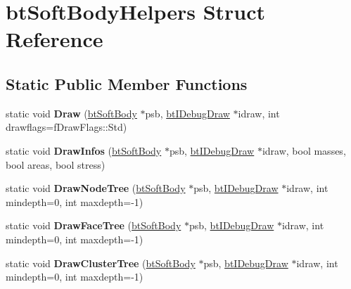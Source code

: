 \hypertarget{structbt_soft_body_helpers}{\section{bt\+Soft\+Body\+Helpers Struct Reference}
\label{structbt_soft_body_helpers}
}
\subsection*{Static Public Member Functions}
\begin{DoxyCompactItemize}
\item 
\hypertarget{structbt_soft_body_helpers_aa13548829cdaa2f8d3cdd682ab658bf7}{static void {\bfseries Draw} (\hyperlink{classbt_soft_body}{bt\+Soft\+Body} $\ast$psb, \hyperlink{classbt_i_debug_draw}{bt\+I\+Debug\+Draw} $\ast$idraw, int drawflags=f\+Draw\+Flags\+::\+Std)}\label{structbt_soft_body_helpers_aa13548829cdaa2f8d3cdd682ab658bf7}

\item 
\hypertarget{structbt_soft_body_helpers_a6f12ed786886ba13224bd36b9f2e2346}{static void {\bfseries Draw\+Infos} (\hyperlink{classbt_soft_body}{bt\+Soft\+Body} $\ast$psb, \hyperlink{classbt_i_debug_draw}{bt\+I\+Debug\+Draw} $\ast$idraw, bool masses, bool areas, bool stress)}\label{structbt_soft_body_helpers_a6f12ed786886ba13224bd36b9f2e2346}

\item 
\hypertarget{structbt_soft_body_helpers_a2e6b38d4cffb1a98d81a3af55704686e}{static void {\bfseries Draw\+Node\+Tree} (\hyperlink{classbt_soft_body}{bt\+Soft\+Body} $\ast$psb, \hyperlink{classbt_i_debug_draw}{bt\+I\+Debug\+Draw} $\ast$idraw, int mindepth=0, int maxdepth=-\/1)}\label{structbt_soft_body_helpers_a2e6b38d4cffb1a98d81a3af55704686e}

\item 
\hypertarget{structbt_soft_body_helpers_a56a1fa5900877d6b0c06de4787a995fe}{static void {\bfseries Draw\+Face\+Tree} (\hyperlink{classbt_soft_body}{bt\+Soft\+Body} $\ast$psb, \hyperlink{classbt_i_debug_draw}{bt\+I\+Debug\+Draw} $\ast$idraw, int mindepth=0, int maxdepth=-\/1)}\label{structbt_soft_body_helpers_a56a1fa5900877d6b0c06de4787a995fe}

\item 
\hypertarget{structbt_soft_body_helpers_a7d0e5fd9ecf565e6605af383092a733f}{static void {\bfseries Draw\+Cluster\+Tree} (\hyperlink{classbt_soft_body}{bt\+Soft\+Body} $\ast$psb, \hyperlink{classbt_i_debug_draw}{bt\+I\+Debug\+Draw} $\ast$idraw, int mindepth=0, int maxdepth=-\/1)}\label{structbt_soft_body_helpers_a7d0e5fd9ecf565e6605af383092a733f}


\end{DoxyCompactItemize}
